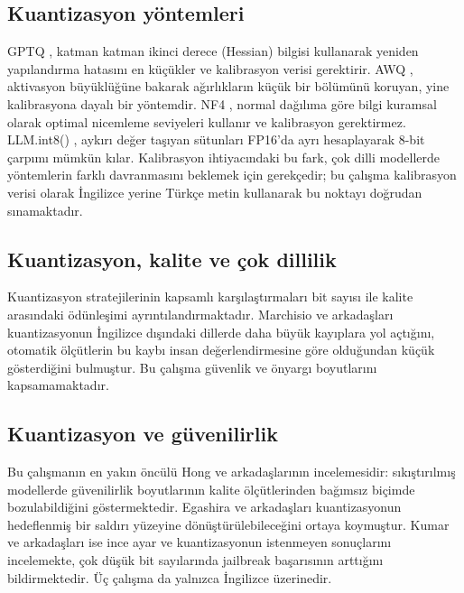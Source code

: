 \documentclass[conference]{IEEEtran}
\begin{document}
\subsection{Kuantizasyon yöntemleri}

GPTQ \cite{frantar2023gptq}, katman katman ikinci derece (Hessian) bilgisi
kullanarak yeniden yapılandırma hatasını en küçükler ve kalibrasyon verisi
gerektirir. AWQ \cite{lin2024awq}, aktivasyon büyüklüğüne bakarak ağırlıkların
küçük bir bölümünü koruyan, yine kalibrasyona dayalı bir yöntemdir. NF4
\cite{dettmers2023qlora}, normal dağılıma göre bilgi kuramsal olarak optimal
nicemleme seviyeleri kullanır ve kalibrasyon gerektirmez. LLM.int8()
\cite{dettmers2022llmint8}, aykırı değer taşıyan sütunları FP16'da ayrı
hesaplayarak 8-bit çarpımı mümkün kılar. Kalibrasyon ihtiyacındaki bu fark,
çok dilli modellerde yöntemlerin farklı davranmasını beklemek için gerekçedir;
bu çalışma kalibrasyon verisi olarak İngilizce yerine Türkçe metin kullanarak
bu noktayı doğrudan sınamaktadır.

\subsection{Kuantizasyon, kalite ve çok dillilik}

Kuantizasyon stratejilerinin kapsamlı karşılaştırmaları
\cite{jin2024comprehensive,li2024evaluating} bit sayısı ile kalite arasındaki
ödünleşimi ayrıntılandırmaktadır. Marchisio ve arkadaşları
\cite{marchisio2024quantization} kuantizasyonun İngilizce dışındaki dillerde
daha büyük kayıplara yol açtığını, otomatik ölçütlerin bu kaybı insan
değerlendirmesine göre olduğundan küçük gösterdiğini bulmuştur. Bu çalışma
güvenlik ve önyargı boyutlarını kapsamamaktadır.

\subsection{Kuantizasyon ve güvenilirlik}

Bu çalışmanın en yakın öncülü Hong ve arkadaşlarının
\cite{hong2024decoding} incelemesidir: sıkıştırılmış modellerde güvenilirlik
boyutlarının kalite ölçütlerinden bağımsız biçimde bozulabildiğini
göstermektedir. Egashira ve arkadaşları \cite{egashira2024exploiting}
kuantizasyonun hedeflenmiş bir saldırı yüzeyine dönüştürülebileceğini ortaya
koymuştur. Kumar ve arkadaşları \cite{kumar2024finetuning} ise ince ayar ve
kuantizasyonun istenmeyen sonuçlarını incelemekte, çok düşük bit sayılarında
jailbreak başarısının arttığını bildirmektedir. Üç çalışma da yalnızca
İngilizce üzerinedir.
\end{document}
